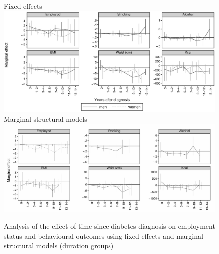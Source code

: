 \begin{figure}
\begin{center}
\caption{\label{fig:duration_g_fe_mi} Analysis of the effect of time since diabetes diagnosis on employment status and behavioural outcomes using fixed effects and marginal structural models (duration groups)}

Fixed effects
\includegraphics[width=\linewidth]{Chapter5/Figures/mi_fe}
Marginal structural models
\includegraphics[width=\linewidth]{Chapter5/Figures/mi_msm_l_all}
\end{center}
\end{figure}


